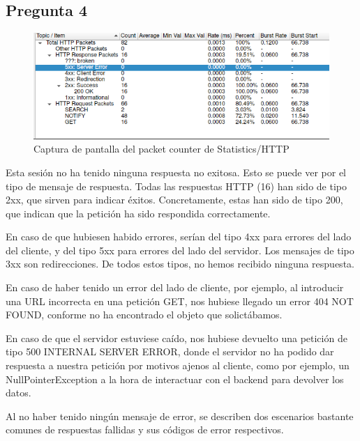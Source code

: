 \documentclass[spanish]{report} %
\begin{document}
\subsection{Pregunta 4}

\begin{figure}[h]
\begin{center}
\includegraphics[scale=.5]{../img/11.png}
\end{center}
\caption{Captura de pantalla del packet counter de Statistics/HTTP}
\end{figure}

Esta sesión no ha tenido ninguna respuesta no exitosa. Esto se puede ver por el
tipo de mensaje de respuesta. Todas las respuestas HTTP (16) han sido de tipo
2xx, que sirven para indicar éxitos. Concretamente, estas han sido de
tipo 200, que indican que la petición ha sido respondida correctamente.\newline

En caso de que hubiesen habido errores, serían del tipo 4xx para errores del
lado del cliente, y del tipo 5xx para errores del lado del servidor. Los
mensajes de tipo 3xx son redirecciones. De todos estos tipos, no hemos recibido
ninguna respuesta.\newline

En caso de haber tenido un error del lado de cliente, por ejemplo, al introducir
una URL incorrecta en una petición GET, nos hubiese llegado un error 404 NOT
FOUND, conforme no ha encontrado el objeto que solictábamos.\newline

En caso de que el servidor estuviese caído, nos hubiese devuelto una petición de
tipo 500 INTERNAL SERVER ERROR, donde el servidor no ha podido dar respuesta a
nuestra petición por motivos ajenos al cliente, como por ejemplo, un
NullPointerException a la hora de interactuar con el backend para devolver los
datos.\newline

Al no haber tenido ningún mensaje de error, se describen dos escenarios bastante
comunes de respuestas fallidas y sus códigos de error respectivos.
\end{document}
